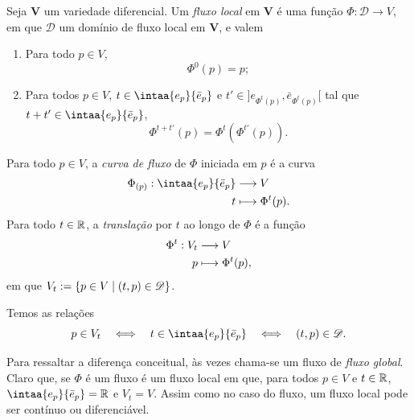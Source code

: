 \begin{defi}
Seja $\bm V$ um variedade diferencial. Um \emph{fluxo local} em $\bm V$ é uma função $\Phi\colon \mathscr{D} \to V$, em que $\mathscr{D}$ um domínio de fluxo local em $\bm V$, e valem
	\begin{enumerate}
	\item Para todo $p \in V$,
		\begin{equation*}
		\Phi^0(p) = p;
		\end{equation*}
	\item Para todos $p \in V$, $t \in \intaa{e_p}{\bar e_p}$ e $t' \in \left.] e_{\Phi^t(p)} , \bar e_{\Phi^t(p)} [\right.$ tal que $t+t' \in \intaa{e_p}{\bar e_p}$,
		\begin{equation*}
		\Phi^{t+t'}(p) = \Phi^t(\Phi^{t'}(p)).
		\end{equation*}
	\end{enumerate}

Para todo $p \in V$, a \emph{curva de fluxo} de $\Phi$ iniciada em $p$ é a curva
	\begin{align*}
	\func{\Phi_{(p)}}{\intaa{e_p}{\bar e_p}}{V}{t}{\Phi^t(p)}.
	\end{align*}
Para todo $t \in \mathbb{R}$, a \emph{translação} por $t$ ao longo de $\Phi$ é a função
	\begin{align*}
	{\Phi^t}: {V_t} &\longrightarrow {V} \\{p} &\longmapsto {\Phi^t(p)},
	\end{align*}
em que $V_t := \left\{p \in V \;\middle\vert\; (t,p) \in \mathscr{D} \right\}$.	
\end{defi}

Temos as relações
	\begin{equation*}
	p \in V_t \sse t \in \intaa{e_p}{\bar e_p} \sse (t,p) \in \mathscr{D}.
	\end{equation*}

Para ressaltar a diferença conceitual, às vezes chama-se um fluxo de \textit{fluxo global}. Claro que, se $\Phi$ é um fluxo é um fluxo local em que, para todos $p \in V$ e $t \in \mathbb{R}$, $\intaa{e_p}{\bar e_p} = \R$ e $V_t=V$. Assim como no caso do fluxo, um fluxo local pode ser contínuo ou diferenciável. 


